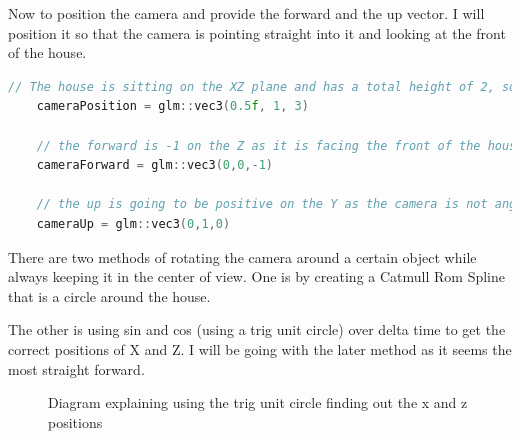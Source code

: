 \documentclass[10pt]{report}
\begin{document}
Now to position the camera and provide the forward and the up vector. I will position it so that the camera is pointing straight into it and looking at the front of the house.
\begin{lstlisting}[language = c]
    // The house is sitting on the XZ plane and has a total height of 2, so I placed the camera on the center with 1 on the Y axis. As the house goes from 0 to 1 on the X, I decided to place the camera in the center, this being 0.5. As the house already extrudes by 1 on the Z axis, I moved the camera back by 2 extra points to make sure that the house will fit into the FOV, making it 3 on the Z.
    cameraPosition = glm::vec3(0.5f, 1, 3) 

    // the forward is -1 on the Z as it is facing the front of the house that has a normal of (0,0,1)
    cameraForward = glm::vec3(0,0,-1) 

    // the up is going to be positive on the Y as the camera is not angled.
    cameraUp = glm::vec3(0,1,0) 
\end{lstlisting}


There are two methods of rotating the camera around a certain object while always keeping it in the center of view.
One is by creating a Catmull Rom Spline that is a circle around the house.

The other is using sin and cos (using a trig unit circle) over delta time to get the correct positions of X and Z. I will be going with the later method as it seems the most straight forward.

\begin{figure}[H]
    \centering
    \caption{Diagram explaining using the trig unit circle finding out the x and z positions}
\end{figure}
\end{document}

